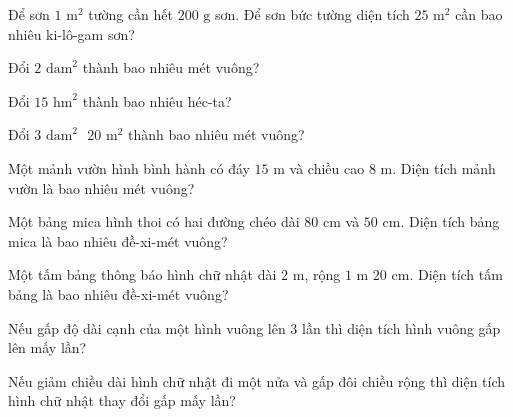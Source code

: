 \begin{ex}
  Để sơn $1\text{ m}^2$ tường cần hết $200\text{ g}$ sơn. Để sơn bức tường diện tích $25\text{ m}^2$ cần bao nhiêu ki-lô-gam sơn?
\end{ex}

\begin{ex}
  Đổi $2\text{ dam}^2$ thành bao nhiêu mét vuông?
\end{ex}

\begin{ex}
  Đổi $15\text{ hm}^2$ thành bao nhiêu héc-ta?
\end{ex}

\begin{ex}
  Đổi $3\text{ dam}^2\text{ } 20\text{ m}^2$ thành bao nhiêu mét vuông?
\end{ex}

\begin{ex}
  Một mảnh vườn hình bình hành có đáy $15\text{ m}$ và chiều cao $8\text{ m}$. Diện tích mảnh vườn là bao nhiêu mét vuông?
\end{ex}

\begin{ex}
  Một bảng mica hình thoi có hai đường chéo dài $80\text{ cm}$ và $50\text{ cm}$. Diện tích bảng mica là bao nhiêu đề-xi-mét vuông?
\end{ex}

\begin{ex}
  Một tấm bảng thông báo hình chữ nhật dài $2\text{ m}$, rộng $1\text{ m } 20\text{ cm}$. Diện tích tấm bảng là bao nhiêu đề-xi-mét vuông?
\end{ex}

\begin{ex}
  Nếu gấp độ dài cạnh của một hình vuông lên $3$ lần thì diện tích hình vuông gấp lên mấy lần?
\end{ex}

\begin{ex}
  Nếu giảm chiều dài hình chữ nhật đi một nửa và gấp đôi chiều rộng thì diện tích hình chữ nhật thay đổi gấp mấy lần?
\end{ex}
